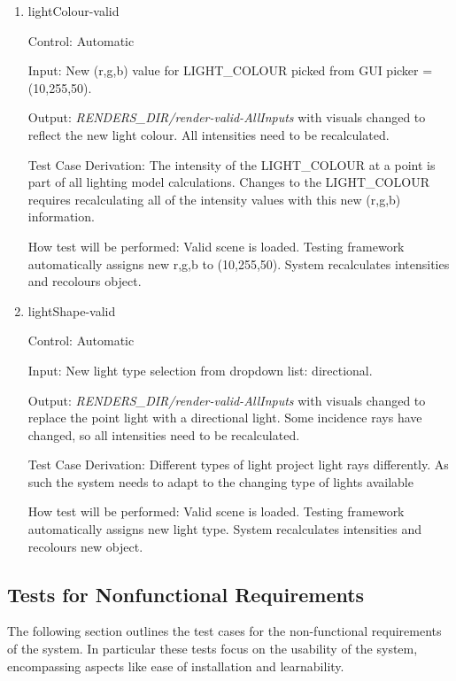 \documentclass[12pt, titlepage]{article}
\begin{document}
\begin{enumerate}
	\item{lightColour-valid\\}
	
	Control: Automatic
	
	Input: New (r,g,b) value for LIGHT\_COLOUR picked from GUI picker = 
	(10,255,50).
	
	Output: \textit{RENDERS\_DIR/render-valid-AllInputs} with visuals changed 
	to reflect the new light colour. All intensities need to be 
	recalculated.
	
	Test Case Derivation: The intensity of the LIGHT\_COLOUR at a point is part 
	of all lighting model calculations. Changes to the LIGHT\_COLOUR requires 
	recalculating all of the intensity values with this new (r,g,b) information.
	
	How test will be performed: Valid scene is loaded. Testing framework 
	automatically assigns new r,g,b to (10,255,50). System recalculates 
	intensities and recolours object.		


	\item{lightShape-valid\\}
	
	Control: Automatic
	
	Input: New light type selection from dropdown list: directional.
	
	Output: \textit{RENDERS\_DIR/render-valid-AllInputs} with visuals changed 
	to replace the point light with a directional light. Some incidence rays 
	have changed, so all intensities need to be recalculated.
	
	Test Case Derivation: Different types of light project light rays 
	differently. As such the system needs to adapt to the changing type of 
	lights available
	
	How test will be performed: Valid scene is loaded. Testing framework 
	automatically assigns new light type. System recalculates 
	intensities and recolours new object.
	
\end{enumerate}

\subsection{Tests for Nonfunctional Requirements}
The following section outlines the test cases for the non-functional 
requirements of the system. In particular these tests focus on the usability of 
the system, encompassing aspects like ease of installation and learnability.
%
%
\end{document}
